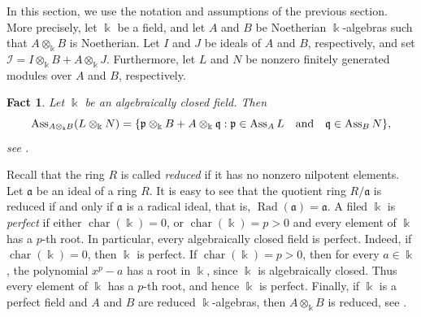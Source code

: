 \documentclass[10pt,a4paper]{amsart}
\numberwithin{equation}{theorem}
\theoremstyle{definition}
\theoremstyle{fact}
\newtheorem{fact}[theorem]{Fact}
\theoremstyle{conjecture}
\newcommand{\Ass}{\operatorname{Ass}}
\newcommand{\fp}{\frak{p}}
\newcommand{\fq}{\frak{q}}
\begin{document}
In this section, we use the notation and assumptions of the previous section. More precisely, let $\Bbbk$ be a field,
 and let $A$ and $B$ be Noetherian $\Bbbk$-algebras such that $A\otimes_\Bbbk B$ is Noetherian.
  Let $I$ and $J$ be ideals of $A$ and $B$, respectively, and set $\mathcal{I}=I\otimes_\Bbbk B+A\otimes_\Bbbk J$.
   Furthermore, let $L$ and $N$ be nonzero finitely generated modules over $A$ and $B$, respectively.
\begin{fact}	
\label{3.1}{\em Let $\Bbbk$ be an algebraically closed field. Then
\[
\Ass_{A \otimes_\Bbbk B} (L\otimes_\Bbbk N)=\{\fp \otimes_\Bbbk B+ A\otimes_\Bbbk \fq: \fp \in \Ass_A  L \quad\text{and}\quad\fq\in \Ass_B N\},
\]
see \cite[Corollary 2.8]{HNTT}.}
\end{fact}


Recall that the ring $R$ is called \emph{reduced} if it has no nonzero nilpotent elements.
Let $\mathfrak{a}$ be an ideal of a ring $R$.  It is easy to see that the quotient ring $R/\mathfrak{a}$
 is reduced if and only if $\mathfrak{a}$ is a radical ideal, that is,
$
\operatorname{Rad}(\mathfrak{a})=\mathfrak{a}.
$
 A filed $\Bbbk$ is \emph{perfect} if either $\operatorname{char}(\Bbbk)=0$, or $\operatorname{char}(\Bbbk)=p>0$ and every element of $\Bbbk$ has a $p$-th root.
In particular, every algebraically closed field is perfect. Indeed, if $\operatorname{char}(\Bbbk)=0$, then $\Bbbk$ is perfect.
If $\operatorname{char}(\Bbbk)=p>0$, then for every $a\in\Bbbk$, the polynomial $x^p-a$ has a root in $\Bbbk$,
 since $\Bbbk$ is algebraically closed. Thus every element of $\Bbbk$ has a $p$-th root, and hence $\Bbbk$ is perfect.
Finally, if $\Bbbk$ is a perfect field and $A$ and $B$ are reduced $\Bbbk$-algebras, then $A\otimes_{\Bbbk}B$ is reduced, see \cite{B}.
\end{document}
